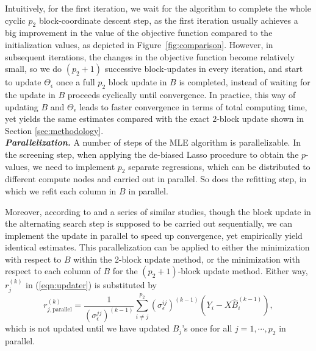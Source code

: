Intuitively, for the first iteration, we wait for the algorithm to complete the whole cyclic $p_2$ block-coordinate descent step, as the first iteration usually achieves a big improvement in the value of the objective function compared to the initialization values, as depicted in Figure~\ref{fig:comparison}.
However, in subsequent iterations, the changes in the objective function become relatively small, so we do $(p_2+1)$ successive block-updates in every iteration, and start to update $\Theta_\epsilon$ once a full $p_2$ block update in $B$ is completed, instead of waiting for the update in $B$ proceeds cyclically until convergence. In practice, this way of updating $B$ and $\Theta_\epsilon$ leads to faster convergence in terms of total computing time, yet yields the same estimates compared with the exact $2$-block update shown in Section \ref{sec:methodology}.   \\

\medskip
\textbf{\textit{Parallelization.}} A number of steps of the MLE algorithm is parallelizable. In the screening step, when applying the de-biased Lasso procedure \citep{javanmard2014confidence} to obtain the $p$-values, we need to implement $p_2$ separate regressions, which can be distributed to different compute nodes and carried out in parallel. So does the refitting step, in which we refit each column in $B$ in parallel. 

Moreover, according to \citet{bradley2011parallel,richtarik2012parallel,scherrer2012scaling} and a series of similar studies, though the block update in the alternating search step is supposed to be carried out sequentially, we can implement the update in parallel to speed up convergence, yet empirically yield identical estimates. This parallelization can be applied to either the minimization with respect to $B$ within the 2-block update method, or the minimization with respect to each column of $B$ for the $(p_2+1)$-block update method. Either way, $r_j^{(k)}$ in (\ref{eqn:updater}) is substituted by
\begin{equation*}
r_{j,\text{parallel}}^{(k)} = \frac{1}{(\sigma^{jj}_\epsilon)^{(k-1)}}\sum_{i\neq j}^{p_2} (\sigma_\epsilon^{ij})^{(k-1)}(Y_i-X\widehat{B}_i^{(k-1)}),
\end{equation*} 
which is not updated until we have updated $B_j$'s once for all $j=1,\cdots,p_2$ in parallel.\\

